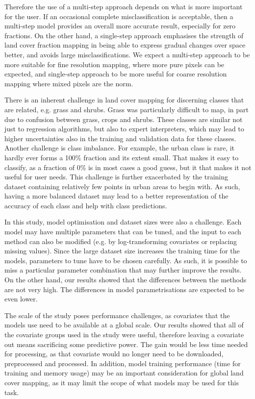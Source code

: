 \documentclass[a4paper,10pt]{article}
\begin{document}
Therefore the use of a multi-step approach depends on what is more important for the user.
If an occasional complete misclassification is acceptable, then a multi-step model provides an overall more accurate result, especially for zero fractions.
On the other hand, a single-step approach emphasises the strength of land cover fraction mapping in being able to express gradual changes over space better, and avoids large misclassifications.
We expect a multi-step approach to be more suitable for fine resolution mapping, where more pure pixels can be expected, and single-step approach to be more useful for coarse resolution mapping where mixed pixels are the norm.

There is an inherent challenge in land cover mapping for discerning classes that are related, e.g. grass and shrubs.
Grass was particularly difficult to map, in part due to confusion between grass, crops and shrubs.
These classes are similar not just to regression algorithms, but also to expert interpreters, which may lead to higher uncertainties also in the training and validation data for these classes.
Another challenge is class imbalance.
For example, the urban class is rare, it hardly ever forms a 100\% fraction and its extent small.
That makes it easy to classify, as a fraction of 0\% is in most cases a good guess, but it that makes it not useful for user needs.
This challenge is further exacerbated by the training dataset containing relatively few points in urban areas to begin with.
As such, having a more balanced dataset may lead to a better representation of the accuracy of each class and help with class predictions.

In this study, model optimisation and dataset sizes were also a challenge.
Each model may have multiple parameters that can be tuned, and the input to each method can also be modified (e.g. by log-transforming covariates or replacing missing values).
Since the large dataset size increases the training time for the models, parameters to tune have to be chosen carefully.
As such, it is possible to miss a particular parameter combination that may further improve the results.
On the other hand, our results showed that the differences between the methods are not very high.
The differences in model parametrisations are expected to be even lower.

The scale of the study poses performance challenges, as covariates that the models use need to be available at a global scale.
Our results showed that all of the covariate groups used in the study were useful, therefore leaving a covariate out means sacrificing some predictive power.
The gain would be less time needed for processing, as that covariate would no longer need to be downloaded, preprocessed and processed.
In addition, model training performance (time for training and memory usage) may be an important consideration for global land cover mapping, as it may limit the scope of what models may be used for this task.
\end{document}
